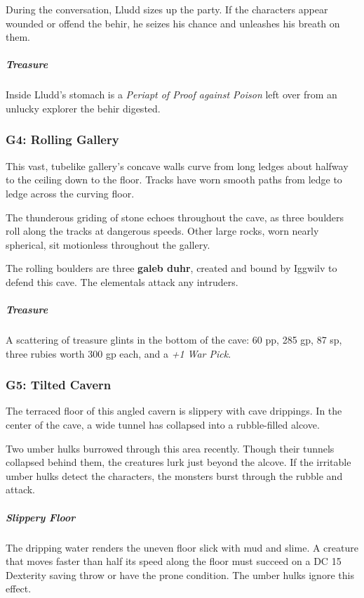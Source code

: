 \documentclass[10pt,a4paper,twoside,bg=print,twocolumn,openany,nodeprecatedcode]{dndbook}
\begin{document}
During the conversation, Lludd sizes up the party. If the characters appear wounded or offend the behir, he seizes his chance and unleashes his breath on them.

\subparagraph{Treasure}
Inside Lludd's stomach is a \textit{Periapt of Proof against Poison} left over from an unlucky explorer the behir digested.

\subsubsection{G4: Rolling Gallery}
\begin{DndReadAloud}{}
This vast, tubelike gallery's concave walls curve from long ledges about halfway to the ceiling down to the floor. Tracks have worn smooth paths from ledge to ledge across the curving floor.

The thunderous griding of stone echoes throughout the cave, as three boulders roll along the tracks at dangerous speeds. Other large rocks, worn nearly spherical, sit motionless throughout the gallery.

\end{DndReadAloud}

The rolling boulders are three \textbf{galeb duhr}, created and bound by Iggwilv to defend this cave. The elementals attack any intruders.

\subparagraph{Treasure}
A scattering of treasure glints in the bottom of the cave: 60 pp, 285 gp, 87 sp, three rubies worth 300 gp each, and a \textit{+1 War Pick}.

\subsubsection{G5: Tilted Cavern}
\begin{DndReadAloud}{}
The terraced floor of this angled cavern is slippery with cave drippings. In the center of the cave, a wide tunnel has collapsed into a rubble-filled alcove.

\end{DndReadAloud}

Two umber hulks burrowed through this area recently. Though their tunnels collapsed behind them, the creatures lurk just beyond the alcove. If the irritable umber hulks detect the characters, the monsters burst through the rubble and attack.

\subparagraph{Slippery Floor}
The dripping water renders the uneven floor slick with mud and slime. A creature that moves faster than half its speed along the floor must succeed on a DC 15 Dexterity saving throw or have the prone condition. The umber hulks ignore this effect.
\end{document}
